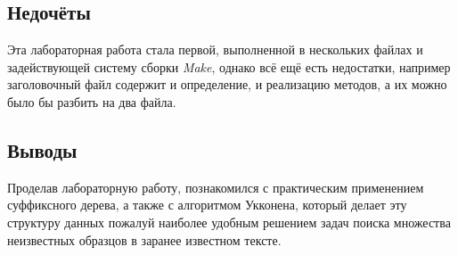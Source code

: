\documentclass[12pt]{article}
\begin{document}
    \subsection*{Недочёты}

    Эта лабораторная работа стала первой, выполненной в нескольких файлах и 
    задействующей систему сборки \textit{Make}, однако всё ещё есть недостатки,
    например заголовочный файл содержит и определение, и реализацию методов, 
    а их можно было бы разбить на два файла.

    \subsection*{Выводы}

    Проделав лабораторную работу, познакомился с практическим применением 
    суффиксного дерева, а также с алгоритмом Укконена, который делает эту 
    структуру данных пожалуй наиболее удобным решением задач поиска множества 
    неизвестных образцов в заранее известном тексте.
\end{document}

